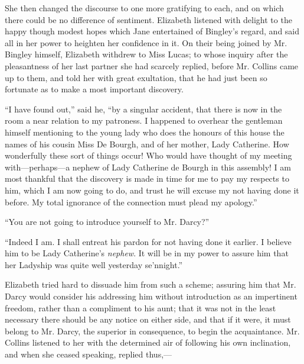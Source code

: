 \documentclass[12pt,openright]{book}
\begin{document}
She then changed the discourse to one more gratifying to each, and on which there could be no difference of sentiment. Elizabeth listened with delight to the happy though modest hopes which Jane entertained of Bingley’s regard, and said all in her power to heighten her confidence in it. On their being joined by Mr. Bingley himself, Elizabeth withdrew to Miss Lucas; to whose inquiry after the pleasantness of her last partner she had scarcely replied, before Mr. Collins came up to them, and told her with great exultation, that he had just been so fortunate as to make a most important discovery.

“I have found out,” said he, “by a singular accident, that there is now in the room a near relation to my patroness. I happened to overhear the gentleman himself mentioning to the young lady who does the honours of this house the names of his cousin Miss De Bourgh, and of her mother, Lady Catherine. How wonderfully these sort of things occur! Who would have thought of my meeting with—perhaps—a nephew of Lady Catherine de Bourgh in this assembly! I am most thankful that the discovery is made in time for me to pay my respects to him, which I am now going to do, and trust he will excuse my not having done it before. My total ignorance of the connection must plead my apology.”

“You are not going to introduce yourself to Mr. Darcy?”

“Indeed I am. I shall entreat his pardon for not having done it earlier. I believe him to be Lady Catherine’s \textit{nephew}. It will be in my power to assure him that her Ladyship was quite well yesterday se’nnight.”

Elizabeth tried hard to dissuade him from such a scheme; assuring him that Mr. Darcy would consider his addressing him without introduction as an impertinent freedom, rather than a compliment to his aunt; that it was not in the least necessary there should be any notice on either side, and that if it were, it must belong to Mr. Darcy, the superior in consequence, to begin the acquaintance. Mr. Collins listened to her with the determined air of following his own inclination, and when she ceased speaking, replied thus,—
\end{document}
